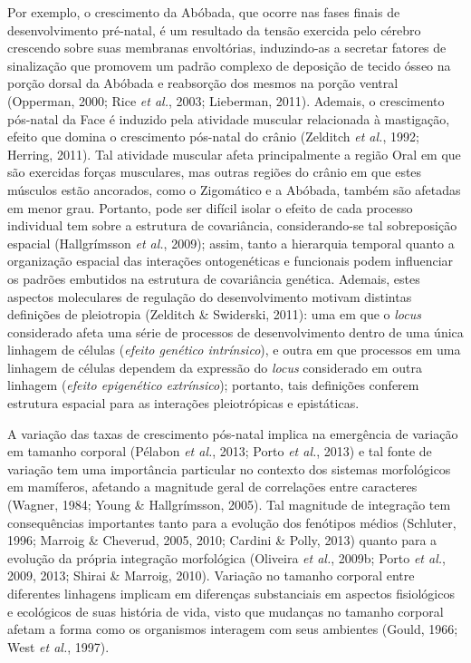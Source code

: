 \documentclass[12pt,twoside]{report}
\begin{document}
Por exemplo, o crescimento da Abóbada, que ocorre nas fases finais de
desenvolvimento pré-natal, é um resultado da tensão exercida pelo
cérebro crescendo sobre suas membranas envoltórias, induzindo-as a
secretar fatores de sinalização que promovem um padrão complexo de
deposição de tecido ósseo na porção dorsal da Abóbada e reabsorção dos
mesmos na porção ventral (Opperman, 2000; Rice \emph{et al.}, 2003;
Lieberman, 2011). Ademais, o crescimento pós-natal da Face é induzido
pela atividade muscular relacionada à mastigação, efeito que domina o
crescimento pós-natal do crânio (Zelditch \emph{et al.}, 1992; Herring,
2011). Tal atividade muscular afeta principalmente a região Oral em que
são exercidas forças musculares, mas outras regiões do crânio em que
estes músculos estão ancorados, como o Zigomático e a Abóbada, também
são afetadas em menor grau. Portanto, pode ser difícil isolar o efeito
de cada processo individual tem sobre a estrutura de covariância,
considerando-se tal sobreposição espacial (Hallgrímsson \emph{et al.},
2009); assim, tanto a hierarquia temporal quanto a organização espacial
das interações ontogenéticas e funcionais podem influenciar os padrões
embutidos na estrutura de covariância genética. Ademais, estes aspectos
moleculares de regulação do desenvolvimento motivam distintas definições
de pleiotropia (Zelditch \& Swiderski, 2011): uma em que o \emph{locus}
considerado afeta uma série de processos de desenvolvimento dentro de
uma única linhagem de células (\emph{efeito genético intrínsico}), e
outra em que processos em uma linhagem de células dependem da expressão
do \emph{locus} considerado em outra linhagem (\emph{efeito epigenético
extrínsico}); portanto, tais definições conferem estrutura espacial para
as interações pleiotrópicas e epistáticas.

A variação das taxas de crescimento pós-natal implica na emergência de
variação em tamanho corporal (Pélabon \emph{et al.}, 2013; Porto
\emph{et al.}, 2013) e tal fonte de variação tem uma importância
particular no contexto dos sistemas morfológicos em mamíferos, afetando
a magnitude geral de correlações entre caracteres (Wagner, 1984; Young
\& Hallgrímsson, 2005). Tal magnitude de integração tem consequências
importantes tanto para a evolução dos fenótipos médios (Schluter, 1996;
Marroig \& Cheverud, 2005, 2010; Cardini \& Polly, 2013) quanto para a
evolução da própria integração morfológica (Oliveira \emph{et al.},
2009b; Porto \emph{et al.}, 2009, 2013; Shirai \& Marroig, 2010).
Variação no tamanho corporal entre diferentes linhagens implicam em
diferenças substanciais em aspectos fisiológicos e ecológicos de suas
história de vida, visto que mudanças no tamanho corporal afetam a forma
como os organismos interagem com seus ambientes (Gould, 1966; West
\emph{et al.}, 1997).
\end{document}
